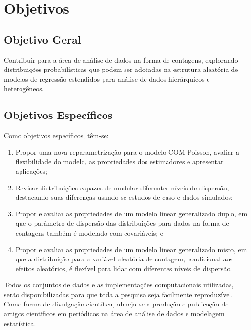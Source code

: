 \documentclass[
    oldfontcommands,
    11pt,
    openright,
    twoside,
    a4paper,
    english,
    brazil
]{abntex2}\usepackage[]{graphicx}\usepackage[]{color}
\begin{document}
\chapter{Objetivos}
\label{cha:objetivos}

\section{Objetivo Geral}
\label{sec:objetivosgerais}

Contribuir para a área de análise de dados na forma de contagens,
explorando distribuições probabilísticas que podem ser adotadas na
estrutura aleatória de modelos de regressão estendidos para análise de
dados hierárquicos e heterogêneos.

\section{Objetivos Específicos}
\label{sec:objetivosespecificos}

Como objetivos específicos, têm-se:

\begin{enumerate}[label=(\roman*)]
\item Propor uma nova reparametrização para o modelo COM-Poisson,
  avaliar a flexibilidade do modelo, as propriedades dos estimadores e
  apresentar aplicações;
\item Revisar distribuições capazes de modelar diferentes níveis de
  dispersão, destacando suas diferenças usando-se estudos de caso e
  dados simulados;
\item Propor e avaliar as propriedades de um modelo linear generalizado
  duplo, em que o parâmetro de dispersão das distribuições para dados na
  forma de contagens também é modelado com covariáveis; e
\item Propor e avaliar as propriedades de um modelo linear generalizado
  misto, em que a distribuição para a variável aleatória de contagem,
  condicional aos efeitos aleatórios, é flexível para lidar com
  diferentes níveis de dispersão.
\end{enumerate}

Todos os conjuntos de dados e as implementações computacionais
utilizadas, serão disponibilizadas para que toda a pesquisa seja
facilmente reproduzível. Como forma de divulgação científica, almeja-se
a produção e publicação de artigos científicos em periódicos na área de
análise de dados e modelagem estatística.
\end{document}
